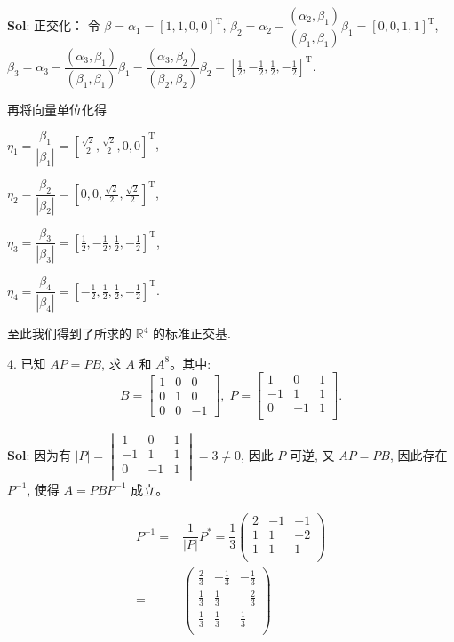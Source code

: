 \textbf{Sol}:  正交化：  
令 $\beta=\alpha_1=[1,1,0,0]^\text{T}$, $\beta_2=\alpha_2-\dfrac{(\alpha_2,\beta_1)}{(\beta_1,\beta_1)}\beta_1=[0,0,1,1]^{\text{T}}$, $\beta_3=\alpha_3-\dfrac{(\alpha_3,\beta_1)}{(\beta_1,\beta_1)}\beta_1-\dfrac{(\alpha_3,\beta_2)}{(\beta_2,\beta_2)}\beta_2=[\frac{1}{2},-\frac{1}{2},\frac{1}{2},-\frac{1}{2}]^\text{T}$.\par


再将向量单位化得 \par
$\eta_1=\dfrac{\beta_1}{|\beta_1|}=[\frac{\sqrt{2}}{2},\frac{\sqrt{2}}{2},0,0]^\text{T}$,\par
$\eta_2=\dfrac{\beta_2}{|\beta_2|}=[0,0,\frac{\sqrt{2}}{2},\frac{\sqrt{2}}{2}]^\text{T}$,\par
$\eta_3=\dfrac{\beta_3}{|\beta_3|}=[\frac{1}{2},-\frac{1}{2},\frac{1}{2},-\frac{1}{2}]^\text{T}$,\par
$\eta_4=\dfrac{\beta_4}{|\beta_4|}=[-\frac{1}{2},\frac{1}{2},\frac{1}{2},-\frac{1}{2}]^\text{T}$.\par

至此我们得到了所求的 $\mathbb{R}^4$ 的标准正交基.

4. 已知 $AP=PB$, 求 $A$ 和 $A^8$。其中:
$$
B=\begin{bmatrix}
1&0&0\\
0&1&0\\
0&0&-1
\end{bmatrix},\;
P=\begin{bmatrix}
    1&0&1\\
    -1&1&1\\
    0&-1&1\\
\end{bmatrix}.
$$

\textbf{Sol}: 因为有 $|P|=\begin{vmatrix}
    1&0&1\\
    -1&1&1\\
    0&-1&1\\
\end{vmatrix}=3\not=0$, 因此 $P$ 可逆, 又 $AP=PB$, 因此存在 $P^{-1}$, 使得 $A=PBP^{-1}$ 成立。

$$
\begin{aligned}
P^{-1}=&\dfrac{1}{|P|}P^{*}=\dfrac{1}{3}
\begin{pmatrix}
2&-1&-1\\
1&1&-2\\
1&1&1\\
\end{pmatrix}\\
=&\begin{pmatrix}
\frac{2}{3}&-\frac{1}{3}&-\frac{1}{3}\\
\frac{1}{3}&\frac{1}{3}&-\frac{2}{3}\\
\frac{1}{3}&\frac{1}{3}&\frac{1}{3}\\
\end{pmatrix}
\end{aligned}
$$

